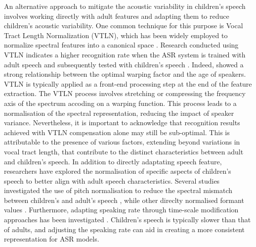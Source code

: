 An alternative approach to mitigate the acoustic variability in children's speech involves working directly with adult features and adapting them to reduce children's acoustic variability. One common technique for this purpose is Vocal Tract Length Normalization (VTLN), which has been widely employed to normalize spectral features into a canonical space \cite{VTLN, VTLN2}. Research conducted using VTLN indicates a higher recognition rate when the ASR system is trained with adult speech and subsequently tested with children's speech \cite{claus2013survey,potamianos1997automatic}. Indeed, \cite{potamianos1997combining} showed a strong relationship between the optimal warping factor and the age of speakers. VTLN is typically applied as a front-end processing step at the end of the feature extraction. The VTLN process involves stretching or compressing the frequency axis of the spectrum accoding on a warping function. This process leads to a normalisation of the spectral representation, reducing the impact of speaker variance. Nevertheless, it is important to acknowledge that recognition results achieved with VTLN compensation alone may still be sub-optimal. This is attributable to the presence of various factors, extending beyond variations in vocal tract length, that contribute to the distinct characteristics between adult and children's speech.
In addition to directly adaptating speech feature, researchers have explored the normalisation of specific aspects of children's speech to better align with adult speech characteristics. Several studies investigated the use of pitch normalisation to reduce the spectral mismatch between children's and adult's speech \cite{f0norm,pitchnorm,pitch_adapt_norm, shahnawazuddin2023gammatone},  while other direclty normalised formant values \cite{formant_norm,kumar2023effect}. Furthermore, adapting speaking rate through time-scale modification approaches has been investigated \cite{speaking_rate}. Children's speech is typically slower than that of adults, and adjusting the speaking rate can aid in creating a more consistent representation for ASR models.
